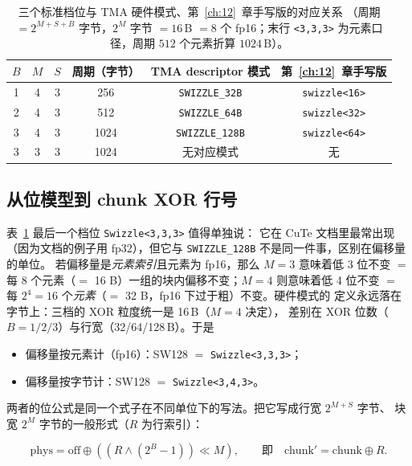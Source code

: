 \begin{table}[htbp]
\centering
\caption{三个标准档位与 TMA 硬件模式、第~\ref{ch:12}~章手写版的对应关系
（周期 $=2^{M+S+B}$ 字节，$2^M$ 字节 $=16$\,B $=8$ 个 fp16；末行
\texttt{<3,3,3>} 为元素口径，周期 $512$ 个元素折算 $1024$\,B）。}
\label{tab:23-modes}
\begin{tabular}{cccccc}
\toprule
$B$ & $M$ & $S$ & 周期（字节） & TMA descriptor 模式 & 第~\ref{ch:12}~章手写版 \\
\midrule
1 & 4 & 3 & 256  & \texttt{SWIZZLE\_32B}  & \texttt{swizzle<16>} \\
2 & 4 & 3 & 512  & \texttt{SWIZZLE\_64B}  & \texttt{swizzle<32>} \\
3 & 4 & 3 & 1024 & \texttt{SWIZZLE\_\allowbreak{}128\allowbreak{}B} & \texttt{swizzle<64>} \\
3 & 3 & 3 & 1024 & 无对应模式 & 无 \\
\bottomrule
\end{tabular}
\end{table}

\subsection{从位模型到 chunk XOR 行号}

表~\ref{tab:23-modes} 最后一个档位 \texttt{Swizzle\allowbreak{}<3,\allowbreak{}3,\allowbreak{}3>} 值得单独说：
它在 CuTe 文档里最常出现（因为文档的例子用 fp32），但它与
\texttt{SWIZZLE\_\allowbreak{}128\allowbreak{}B} 不是同一件事，区别在偏移量的单位。
若偏移量是\emph{元素索引}且元素为 fp16，那么 $M=3$ 意味着低 3 位不变
$=$ 每 8 个元素（$=$ 16 B）一组的块内偏移不变；$M=4$ 则意味着低 4 位不变
$=$ 每 $2^4=16$ 个\emph{元素}（$=$ 32 B，fp16 下过于粗）不变。硬件模式的
定义永远落在字节上：三档的 XOR 粒度统一是 16\,B（$M=4$ 决定），
差别在 XOR 位数（$B=1/2/3$）与行宽（32/64/128\,B）。于是

\begin{itemize}[leftmargin=2em]
\item 偏移量按元素计（fp16）：SW128 $=$ \texttt{Swizzle\allowbreak{}<3,\allowbreak{}3,\allowbreak{}3>}；
\item 偏移量按字节计：SW128 $=$ \texttt{Swizzle\allowbreak{}<3,\allowbreak{}4,\allowbreak{}3>}。
\end{itemize}

两者的位公式是同一个式子在不同单位下的写法。把它写成行宽 $2^{M+S}$ 字节、
块宽 $2^M$ 字节的一般形式（$R$ 为行索引）：

\begin{equation}
\label{eq:23-chunk}
\text{phys} = \text{off} \oplus \left(\left(R \wedge (2^B-1)\right)
\ll M\right),
\qquad \text{即}\quad \text{chunk}' = \text{chunk} \oplus R .
\end{equation}

